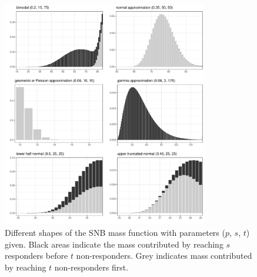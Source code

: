 \documentclass[sii]{ipart}
\begin{document}
\begin{figure}[htbp!]
\begin{center}
\includegraphics[width=0.8\textwidth]{shapes.pdf}
\end{center}
\caption{Different shapes of the SNB mass function with parameters 
($p$, $s$, $t$) given. Black areas indicate the mass contributed by reaching
$s$ responders before $t$ non-responders. Grey indicates
mass contributed by reaching $t$ non-responders first. \label{shapes.fig}}
\end{figure}

\pagebreak
\end{document}
